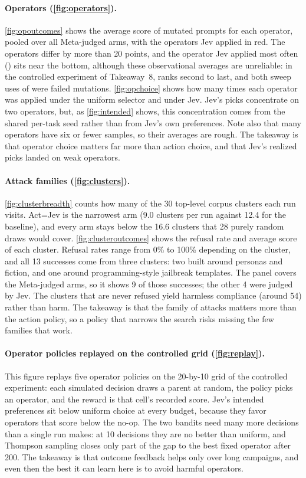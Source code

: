 \documentclass{article}
\newcommand{\op}[1]{\texttt{\detokenize{#1}}}
\newcommand{\para}[1]{\paragraph{#1}}
\begin{document}
\para{Operators (\autoref{fig:operators}).}
\autoref{fig:opoutcomes} shows the average score of mutated prompts for each operator, pooled over all Meta-judged arms, with the operators Jev applied in red.
The operators differ by more than 20 points, and the operator Jev applied most often (\op{semantic_steganography}) sits near the bottom, although these observational averages are unreliable: in the controlled experiment of Takeaway~8, \op{artprompt} ranks second to last, and both sweep uses of \op{many_shot_jailbreaking} were failed mutations.
\autoref{fig:opchoice} shows how many times each operator was applied under the uniform selector and under Jev.
Jev's picks concentrate on two operators, but, as \autoref{fig:intended} shows, this concentration comes from the shared per-task seed rather than from Jev's own preferences.
Note also that many operators have six or fewer samples, so their averages are rough.
The takeaway is that operator choice matters far more than action choice, and that Jev's realized picks landed on weak operators.

\para{Attack families (\autoref{fig:clusters}).}
\autoref{fig:clusterbreadth} counts how many of the 30 top-level corpus clusters each run visits.
Act=Jev is the narrowest arm (9.0 clusters per run against 12.4 for the baseline), and every arm stays below the 16.6 clusters that 28 purely random draws would cover.
\autoref{fig:clusteroutcomes} shows the refusal rate and average score of each cluster.
Refusal rates range from 0\% to 100\% depending on the cluster, and all 13 successes come from three clusters: two built around personas and fiction, and one around programming-style jailbreak templates.
The panel covers the Meta-judged arms, so it shows 9 of those successes; the other 4 were judged by Jev.
The clusters that are never refused yield harmless compliance (around 54) rather than harm.
The takeaway is that the family of attacks matters more than the action policy, so a policy that narrows the search risks missing the few families that work.

\para{Operator policies replayed on the controlled grid (\autoref{fig:replay}).}
This figure replays five operator policies on the 20-by-10 grid of the controlled experiment: each simulated decision draws a parent at random, the policy picks an operator, and the reward is that cell's recorded score.
Jev's intended preferences sit below uniform choice at every budget, because they favor operators that score below the no-op.
The two bandits need many more decisions than a single run makes: at 10 decisions they are no better than uniform, and Thompson sampling closes only part of the gap to the best fixed operator after 200.
The takeaway is that outcome feedback helps only over long campaigns, and even then the best it can learn here is to avoid harmful operators.
\end{document}
